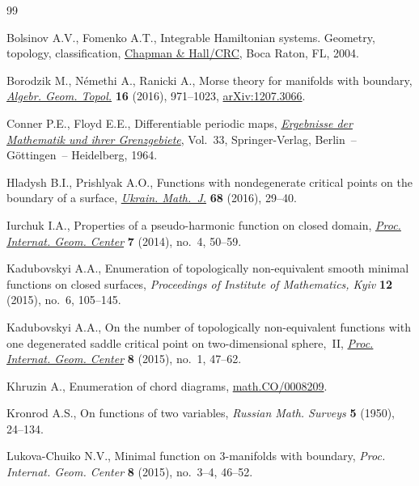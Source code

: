 \documentclass[pdftex]{sigma}
\numberwithin{equation}{section}
\begin{document}
\begin{thebibliography}{99}
\footnotesize\itemsep=0pt

Bolsinov A.V., Fomenko A.T., Integrable {H}amiltonian systems. Geometry,
 topology, classif\/ication, \href{https://doi.org/10.1201/9780203643426}{Chapman \& Hall/CRC}, Boca Raton, FL, 2004.

Borodzik M., N\'emethi A., Ranicki A., Morse theory for manifolds with
 boundary, \href{https://doi.org/10.2140/agt.2016.16.971}{\textit{Algebr. Geom. Topol.}} \textbf{16} (2016), 971--1023,
 \href{https://arxiv.org/abs/1207.3066}{arXiv:1207.3066}.

Conner P.E., Floyd E.E., Dif\/ferentiable periodic maps, \href{https://doi.org/10.1007/978-3-662-41633-4}{\textit{Ergebnisse der
 Mathematik und ihrer Grenzgebiete}}, Vol.~33, Springer-Verlag, Berlin~--
 G\"ottingen~-- Heidelberg, 1964.

Hladysh B.I., Prishlyak A.O., Functions with nondegenerate critical points on
 the boundary of a surface, \href{https://doi.org/10.1007/s11253-016-1206-5}{\textit{Ukrain. Math.~J.}} \textbf{68} (2016),
 29--40.

Iurchuk I.A., Properties of a pseudo-harmonic function on closed domain,
 \href{https://doi.org/10.15673/2072-9812.4/2014.41445}{\textit{Proc. Internat. Geom. Center}} \textbf{7} (2014), no.~4, 50--59.

Kadubovskyi A.A., Enumeration of topologically non-equivalent smooth minimal
 functions on closed surfaces, \textit{Proceedings of Institute of Mathematics, Kyiv} \textbf{12} (2015), no.~6, 105--145.

Kadubovskyi A.A., On the number of topologically non-equivalent functions with
 one degenerated saddle critical point on two-dimensional sphere,~II,
 \href{https://doi.org/10.15673/2072-9812.1/2015.50155}{\textit{Proc. Internat. Geom. Center}} \textbf{8} (2015), no.~1, 47--62.

Khruzin A., Enumeration of chord diagrams, \href{https://arxiv.org/abs/math.CO/0008209}{math.CO/0008209}.

Kronrod A.S., On functions of two variables, \textit{Russian Math. Surveys}
 \textbf{5} (1950), 24--134.

Lukova-Chuiko N.V., Minimal function on 3-manifolds with boundary,
 \textit{Proc. Internat. Geom. Center} \textbf{8} (2015), no.~3--4, 46--52.


\end{thebibliography}
\end{document}
